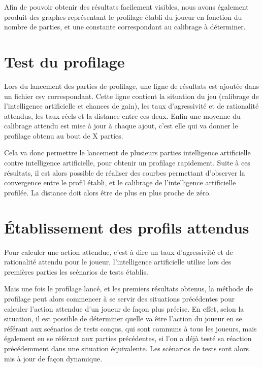 \documentclass{report}
\begin{document}
Afin de pouvoir obtenir des résultats facilement visibles, nous avons également produit des graphes représentant le profilage établi du joueur en fonction du nombre de parties, et une constante correspondant au calibrage à déterminer.\\


\section{Test du profilage}

\hspace{0.5cm}Lors du lancement des parties de profilage, une ligne de résultats est ajoutée dans un fichier csv correspondant. Cette ligne contient la situation du jeu (calibrage de l'intelligence artificielle et chances de gain), les taux d'agressivité et de rationalité attendus, les taux réels et la distance entre ces deux. Enfin une moyenne du calibrage attendu est mise à jour à chaque ajout, c'est elle qui va donner le profilage obtenu au bout de X parties.\par
Cela va donc permettre le lancement de plusieurs parties intelligence artificielle contre intelligence artificielle, pour obtenir un profilage rapidement. Suite à ces résultats, il est alors possible de réaliser des courbes permettant d'observer la convergence entre le profil établi, et le calibrage de l'intelligence artificielle profilée. La distance doit alors être de plus en plus proche de zéro.


\section{Établissement des profils attendus}

\hspace{0.5cm}Pour calculer une action attendue, c'est à dire un taux d'agressivité et de rationalité attendu pour le joueur, l'intelligence artificielle utilise lors des premières parties les scénarios de tests établis.\par
Mais une fois le profilage lancé, et les premiers résultats obtenus, la méthode de profilage peut alors commencer à se servir des situations précédentes pour calculer l'action attendue d'un joueur de façon plus précise. En effet, selon la situation, il est possible de déterminer quelle va être l'action du joueur en se référant aux scénarios de tests conçus, qui sont communs à tous les joueurs, mais également en se référant aux parties précédentes, si l'on a déjà testé sa réaction précédemment dans une situation équivalente. Les scénarios de tests sont alors mis à jour de façon dynamique.\par 
\end{document}

